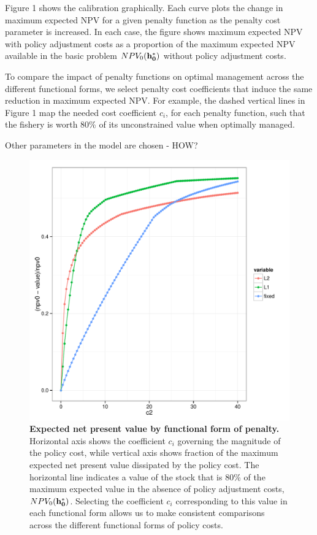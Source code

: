 \documentclass{article}\usepackage[]{graphicx}\usepackage[]{color}
\makeatletter
\def\maxwidth{ %
  \ifdim\Gin@nat@width>\linewidth
    \linewidth
  \else
    \Gin@nat@width
  \fi
}
\newenvironment{knitrout}{}{} %
\makeatother
\begin{document}
Figure 1 shows the calibration graphically.  Each curve plots the change in maximum expected NPV for a given penalty function as the penalty cost parameter is increased. In each case, the figure shows maximum expected NPV with policy adjustment costs as a proportion of the maximum expected NPV available in the basic problem $NPV_0({\bf h_0^*})$ without policy adjustment costs. 

To compare the impact of penalty functions on optimal management across the different functional forms, we select penalty cost coefficients that induce the same reduction in maximum expected NPV. For example, the dashed vertical lines in Figure 1 map the needed cost coefficient $c_i$, for each penalty function, such that the fishery is worth 80\% of its unconstrained value when optimally managed. 

Other parameters in the model are chosen - HOW? 


\begin{figure}
\begin{knitrout}
\color{fgcolor}
\includegraphics[width=\maxwidth]{figure/Figure_1} 

\end{knitrout}


\caption{\textbf{Expected net present value by functional form of penalty.} Horizontal axis shows the coefficient $c_i$ governing the magnitude of the policy cost, while vertical axis shows fraction of the maximum expected net present value dissipated by the policy cost.  The horizontal line indicates a value of the stock that is 80\% of the maximum expected value in the absence of policy adjustment costs, $NPV_0({\bf h_0^*})$. Selecting the coefficient $c_i$ corresponding to this value in each functional form allows us to make consistent comparisons across the different functional forms of policy costs.  }
\end{figure}
\end{document}
